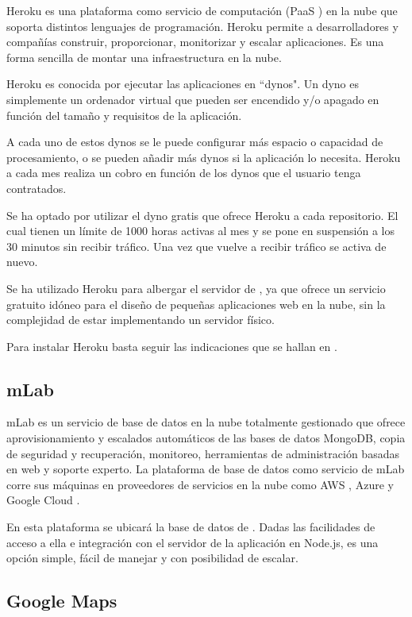 Heroku es una plataforma como servicio de computación (PaaS \cite{URL::PaaS}) en la nube que soporta distintos lenguajes de programación. Heroku permite a desarrolladores y compañías construir, proporcionar, monitorizar y escalar aplicaciones. Es una forma sencilla de montar una infraestructura en la nube.

Heroku es conocida por ejecutar las aplicaciones en ``dynos". Un dyno es simplemente un ordenador virtual que pueden ser encendido y/o apagado en función del tamaño y requisitos de la aplicación.

A cada uno de estos dynos se le puede configurar más espacio o capacidad de procesamiento, o se pueden añadir más dynos si la aplicación lo necesita. Heroku a cada mes realiza un cobro en función de los dynos que el usuario tenga contratados. 

Se ha optado por utilizar el dyno gratis que ofrece Heroku a cada repositorio. El cual tienen un límite de 1000 horas activas al mes y se pone en suspensión a los 30 minutos sin recibir tráfico. Una vez que vuelve a recibir tráfico se activa de nuevo.   

Se ha utilizado Heroku para albergar el servidor de \ULLAR{}, ya que ofrece un servicio gratuito idóneo para el diseño de pequeñas aplicaciones web en la nube, sin la complejidad de estar implementando un servidor físico. 

Para instalar Heroku basta seguir las indicaciones que se hallan en \cite{URL::HerokuCLI}.


\subsection{ mLab }
mLab es un servicio de base de datos en la nube totalmente gestionado que ofrece aprovisionamiento y escalados automáticos de las bases de datos MongoDB, copia de seguridad y recuperación, monitoreo, herramientas de administración basadas en web y soporte experto. La plataforma de base de datos como servicio de mLab corre sus máquinas en proveedores de servicios en la nube como AWS \cite{URL::aws}, Azure \cite{URL::Azure} y Google Cloud \cite{URL::GoogleCloud}.

En esta plataforma se ubicará la base de datos de \ULLAR{}. 
Dadas las facilidades de acceso a ella e integración con el servidor de la aplicación en Node.js, es una opción simple, fácil de manejar y con posibilidad de escalar.

\subsection{ Google Maps }

